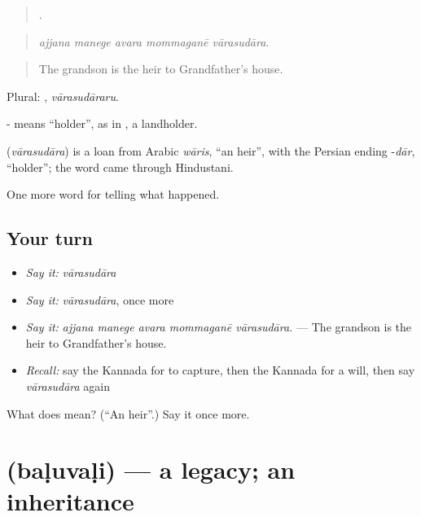 \begin{quote}
    .
\end{quote}

\begin{quote}
\emph{ajjana manege avara mommaganē vārasudāra.}
\end{quote}

\begin{quote}
The grandson is the heir to Grandfather's house.
\end{quote}

Plural: , \emph{vārasudāraru}.

- means \textquotedblleft{}holder\textquotedblright{}, as in , a landholder.

\begin{cousinweb}
\textbf{} (\emph{vārasudāra}) is a loan from Arabic \emph{wāris}, \textquotedblleft{}an heir\textquotedblright{}, with the Persian ending -\emph{dār}, \textquotedblleft{}holder\textquotedblright{}; the word came through Hindustani.
\end{cousinweb}

\begin{grammarlens}[title={What you've built}]
One more word for telling what happened.
\end{grammarlens}

\subsection*{Your turn}
\begin{itemize}
\raggedright
  \item \emph{Say it:} \emph{vārasudāra}
  \item \emph{Say it:} \emph{vārasudāra}, once more
  \item \emph{Say it:} \emph{ajjana manege avara mommaganē vārasudāra.} — The grandson is the heir to Grandfather's house.
  \item \emph{Recall:} say the Kannada for to capture, then the Kannada for a will, then say \emph{vārasudāra} again
\end{itemize}

\begin{tcolorbox}[breakable,colback=teal!4,colframe=teal!35!black,title={Before you move on}]
What does  mean? (\textquotedblleft{}An heir\textquotedblright{}.) Say it once more.
\end{tcolorbox}
\section[\texorpdfstring{\kn{ಬಳುವಳಿ} (baḷuvaḷi)}{ಬಳುವಳಿ (baḷuvaḷi)}]{ (baḷuvaḷi) — a legacy; an inheritance}

